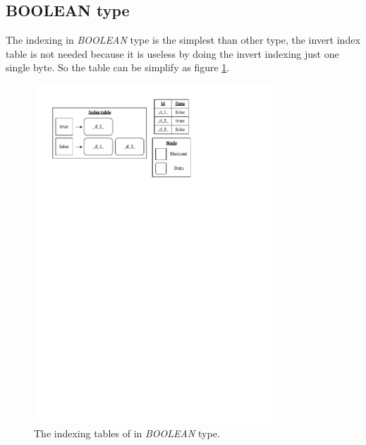 \subsection{BOOLEAN type}

The indexing in \textit{BOOLEAN} type is the simplest than other type, the invert index table is not needed because it is useless by doing the invert indexing just one single byte. So the table can be simplify as figure \ref{fig:algorithm:boolean:example_1}.

\begin{figure}[ht]
\centering
\includegraphics[width=0.8\textwidth]{./algorithm/boolean/pic/example_1_v1.pdf}
\caption{The indexing tables of in \textit{BOOLEAN} type.}
\label{fig:algorithm:boolean:example_1}
\end{figure}












\clearpage
